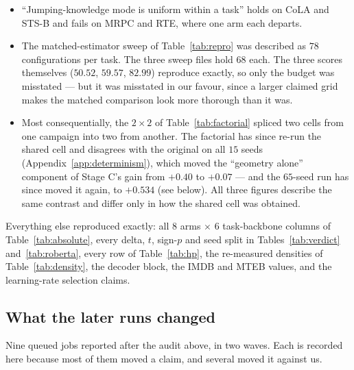 \documentclass{article}
\begin{document}
\begin{itemize}
      uncorrected on STS-B ($+0.32$, $t=3.13$, $p=0.035$) and was not marked.
\item ``Jumping-knowledge mode is uniform within a task'' holds on CoLA and
      STS-B and fails on MRPC and RTE, where one arm each departs.
\item The matched-estimator sweep of Table~\ref{tab:repro} was described as
      $78$ configurations per task. The three sweep files hold $68$ each. The
      three scores themselves ($50.52$, $59.57$, $82.99$) reproduce exactly, so
      only the budget was misstated --- but it was misstated in our favour,
      since a larger claimed grid makes the matched comparison look more
      thorough than it was.
\item Most consequentially, the $2\times2$ of Table~\ref{tab:factorial} spliced
      two cells from one campaign into two from another. The factorial has since
      re-run the shared cell and disagrees with the original on all $15$ seeds
      (Appendix~\ref{app:determinism}), which moved the ``geometry alone''
      component of Stage C's gain from $+0.40$ to $+0.07$ --- and the $65$-seed
      run has since moved it again, to $+0.534$ (see below). All three figures
      describe the same contrast and differ only in how the shared cell was
      obtained.
\end{itemize}

Everything else reproduced exactly: all $8$ arms $\times$ $6$ task-backbone
columns of Table~\ref{tab:absolute}, every delta, $t$, sign-$p$ and seed split
in Tables~\ref{tab:verdict} and~\ref{tab:roberta}, every row of
Table~\ref{tab:hp}, the re-measured densities of Table~\ref{tab:density}, the
decoder block, the IMDB and MTEB values, and the learning-rate selection claims.

\subsection*{What the later runs changed}

Nine queued jobs reported after the audit above, in two waves. Each is recorded
here because most of them moved a claim, and several moved it against us.
\end{document}

